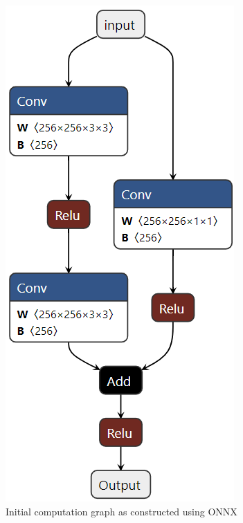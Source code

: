\documentclass[12pt,a4paper,twoside,openright,bibliography=totocnumbered]{report}
\begin{document}
\begin{figure}[ht!]
    \begin{center}
	      \includegraphics[scale=0.45]{reportImages/initial_graph.png}   
    \end{center}	
    \caption{Initial computation graph as constructed using ONNX}
	\label{initial_graph}
\end{figure}
\end{document}
